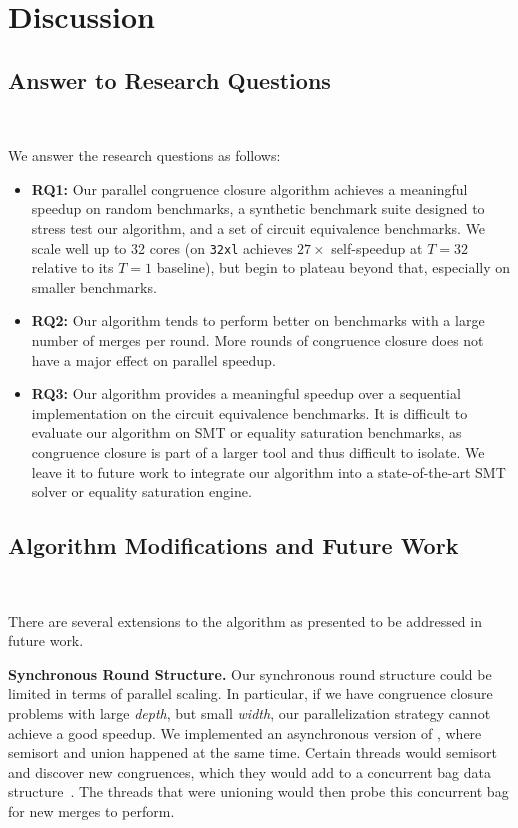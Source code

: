 \section{Discussion}
\label{sec:discussion}

\subsection{Answer to Research Questions}~\label{sec:disc:rq}

We answer the research questions as follows:

\begin{itemize}
  \item \textbf{RQ1:} Our parallel congruence closure algorithm achieves a
  meaningful speedup on random benchmarks, a synthetic benchmark suite designed
  to stress test our algorithm, and a set of circuit equivalence benchmarks.
  We scale well up to 32 cores (\filteralgo on \texttt{32xl} achieves
  $27\times$ self-speedup at $T{=}32$ relative to its $T{=}1$ baseline), but
  begin to plateau beyond that, especially on smaller benchmarks.
  \item \textbf{RQ2:} Our algorithm tends to perform better on benchmarks with a
  large number of merges per round. More rounds of congruence closure does not
  have a major effect on parallel speedup.
  \item \textbf{RQ3:} Our algorithm provides a meaningful speedup over a
  sequential implementation on the circuit equivalence benchmarks. It is
  difficult to evaluate our algorithm on SMT or equality saturation benchmarks,
  as congruence closure is part of a larger tool and thus difficult to isolate.
  We leave it to future work to integrate our algorithm into a state-of-the-art
  SMT solver or equality saturation engine.
\end{itemize}

\subsection{Algorithm Modifications and Future Work}~\label{sec:disc:limit-alg}

There are several extensions to the algorithm as presented to be addressed in 
future work.

\textbf{Synchronous Round Structure.} Our synchronous round structure could be
limited in terms of parallel scaling. In particular, if we have congruence
closure problems with large \emph{depth}, but small \emph{width}, our
parallelization strategy cannot achieve a good speedup. We implemented an
asynchronous version of \filteralgo, where semisort and union happened at
the same time. Certain threads would semisort and discover new congruences,
which they would add to a concurrent bag data
structure~\cite{concurrentbag}. The threads that were unioning would then
probe this concurrent bag for new merges to perform.

